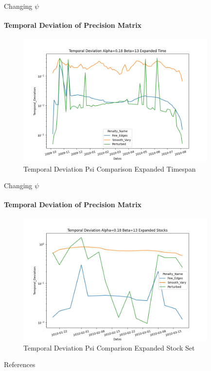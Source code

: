 \documentclass{beamer}
\begin{document}
\begin{frame}{Changing $\psi$}
\framesubtitle{Temporal Deviation of Precision Matrix}

\begin{figure}
  \includegraphics[width=10cm]{TemporalDevPsi1_3_5Alpha0.18Beta13TimeExpand.png}
  \caption{Temporal Deviation Psi Comparison Expanded Timespan}
  \label{fig:TempDevTimeExp}
\end{figure}

\end{frame}

\begin{frame}{Changing $\psi$}
\framesubtitle{Temporal Deviation of Precision Matrix}

\begin{figure}
  \includegraphics[width=10cm]{TemporalDevPsi1_3_5Alpha0.18Beta13StockExpand.png}
  \caption{Temporal Deviation Psi Comparison Expanded Stock Set}
  \label{fig:TempDevStockExp}
\end{figure}

\end{frame}

\begin{frame}{References}
    \nocite{*}
    
    
\end{frame}
\end{document}
